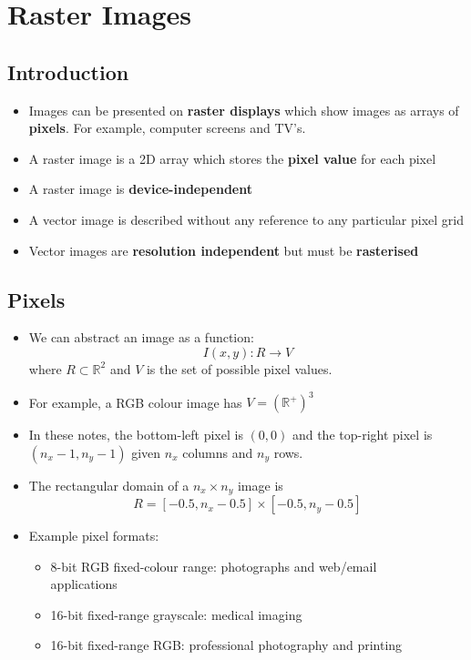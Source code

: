 
\section{Raster Images}

\subsection{Introduction}

\begin{itemize}
  \item Images can be presented on \textbf{raster displays} which show images as arrays of \textbf{pixels}. For example, computer screens and TV's.
  \item A raster image is a 2D array which stores the \textbf{pixel value} for each pixel
  \item A raster image is \textbf{device-independent}
  \item A vector image is described without any reference to any particular pixel grid
  \item Vector images are \textbf{resolution independent} but must be \textbf{rasterised}
\end{itemize}

\subsection{Pixels}

\begin{itemize}
  \item We can abstract an image as a function:
    \begin{equation*}
      I(x,y) : R \rightarrow V
    \end{equation*}
        where $R \subset \mathbb{R}^{2}$ and $V$ is the set of possible pixel values.
  \item For example, a RGB colour image has $V = (\mathbb{R}^{+})^{3}$
  \item In these notes, the bottom-left pixel is $(0,0)$ and the top-right pixel is $(n_{x} - 1, n_{y} - 1)$ given $n_{x}$ columns and $n_{y}$ rows.
  \item The rectangular domain of a $n_{x} \times n_{y}$ image is
  \begin{equation*}
    R = [-0.5, n_{x} - 0.5] \times [-0.5, n_{y} - 0.5]
  \end{equation*}
  \item Example pixel formats:
    \begin{itemize}
      \item 8-bit RGB fixed-colour range: photographs and web/email \\ applications
      \item 16-bit fixed-range grayscale: medical imaging
      \item 16-bit fixed-range RGB: professional photography and printing
    \end{itemize}
\end{itemize}
\newpage

